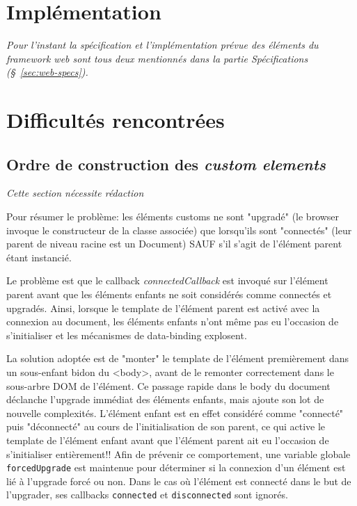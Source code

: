 \section{Implémentation}

\textit{Pour l'instant la spécification et l'implémentation prévue des éléments du framework web sont tous deux mentionnés dans la partie Spécifications (§~\ref{sec:web-specs}).}

\newpage
\section{Difficultés rencontrées}
\subsection{Ordre de construction des \emph{custom elements}}

\textit{Cette section nécessite rédaction}

Pour résumer le problème: les éléments customs ne sont "upgradé" (le browser invoque le constructeur de la classe associée) que lorsqu'ils sont "connectés" (leur parent de niveau racine est un Document) SAUF s'il s'agit de l'élément parent étant instancié.

Le problème est que le callback \emph{connectedCallback} est invoqué sur l'élément parent avant que les éléments enfants ne soit considérés comme connectés et upgradés. Ainsi, lorsque le template de l'élément parent est activé avec la connexion au document, les éléments enfants n'ont même pas eu l'occasion de s'initialiser et les mécanismes de data-binding explosent.

La solution adoptée est de "monter" le template de l'élément premièrement dans un sous-enfant bidon du <body>, avant de le remonter correctement dans le sous-arbre DOM de l'élément. Ce passage rapide dans le body du document déclanche l'upgrade immédiat des éléments enfants, mais ajoute son lot de nouvelle complexités. L'élément enfant est en effet considéré comme "connecté" puis "déconnecté" au cours de l'initialisation de son parent, ce qui active le template de l'élément enfant avant que l'élément parent ait eu l'occasion de s'initialiser entièrement!! Afin de prévenir ce comportement, une variable globale \texttt{forcedUpgrade} est maintenue pour déterminer si la connexion d'un élément est lié à l'upgrade forcé ou non. Dans le cas où l'élément est connecté dans le but de l'upgrader, ses callbacks \texttt{connected} et \texttt{disconnected} sont ignorés.

